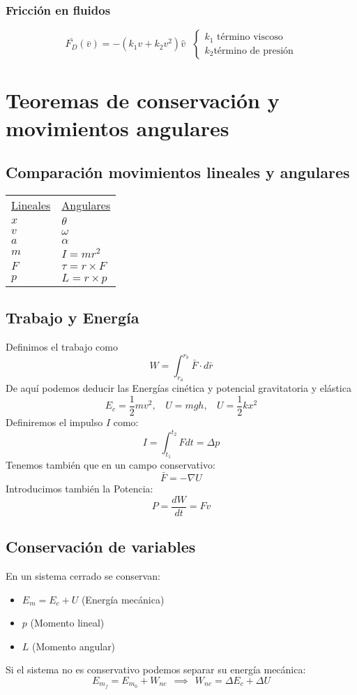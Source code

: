 \documentclass[12pt]{article}
\begin{document}
\subsubsection{Fricción en fluidos}
\[\bar{F_D}(\bar{v})=-(k_1v+k_2v^2)\hat{v} \ \ \ \left\{
\begin{array}{c}
	k_1 \mbox{ término viscoso} \\
	k_2 \mbox{término de presión}
\end{array}\right. \]

\section{Teoremas de conservación y movimientos angulares}
	\subsection{Comparación movimientos lineales y angulares}
	\begin{table}[h!]
\begin{tabular}{ll}
\underline{Lineales} & \underline{Angulares} \\
$x$ & $\theta$  \\
$v$ & $\omega$ \\
$a$ & $\alpha$ \\
$m$ & $I=mr^2$ \\
$F$ & $\tau=r \times F$\\
$p$ & $L=r \times p$
\end{tabular}
\end{table}
	\subsection{Trabajo y Energía}
	Definimos el trabajo como 
	\[W=\int_{r_a}^{r_b}{\bar{F}\cdot d\bar{r}}\]
	De aquí podemos deducir las Energías cinética y potencial gravitatoria y elástica
	\[E_c=\frac{1}{2}mv^2, \ \ \ \ U=mgh, \ \ \ \ U=\frac{1}{2}kx^2\]
	Definiremos el impulso $I$ como:
	\[I=\int_{t_1}^{t_2}{Fdt}=\Delta p\]
	Tenemos también que en un campo conservativo:
	\[\bar{F}=-\nabla U\]
	Introducimos también la Potencia:
	\[P=\frac{dW}{dt}=Fv\]
	\subsection{Conservación de variables}	
	En un sistema cerrado se conservan:
	\begin{itemize}
		\item $E_m=E_c+U$ (Energía mecánica)
		\item $p$ (Momento lineal)
		\item $L$ (Momento angular)
	\end{itemize}
	Si el sistema no es conservativo podemos separar su energía mecánica:
	\[E_{m_f}=E_{m_0}+W_{nc} \ \ \implies \ \ W_{nc}=\Delta E_c + \Delta U\]
	
\end{document}
